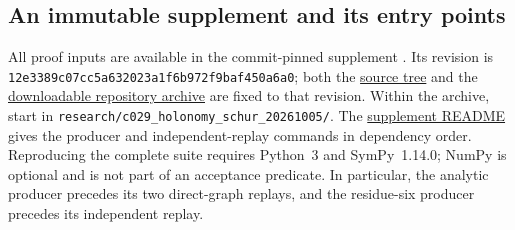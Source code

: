 \subsection{An immutable supplement and its entry points}

All proof inputs are available in the commit-pinned supplement
\cite{C029Supplement}. Its revision is
\nolinkurl{12e3389c07cc5a632023a1f6b972f9baf450a6a0}; both the
\href{https://github.com/whzy3185/math/tree/12e3389c07cc5a632023a1f6b972f9baf450a6a0/research/c029_holonomy_schur_20261005}{source tree}
and the \href{https://github.com/whzy3185/math/archive/12e3389c07cc5a632023a1f6b972f9baf450a6a0.zip}{downloadable repository archive}
are fixed to that revision. Within the archive, start in
\nolinkurl{research/c029_holonomy_schur_20261005/}.
The \href{https://github.com/whzy3185/math/blob/12e3389c07cc5a632023a1f6b972f9baf450a6a0/research/c029_holonomy_schur_20261005/README.md}{supplement README}
gives the producer and independent-replay commands in dependency order.
Reproducing the complete suite requires Python~3 and SymPy~1.14.0;
NumPy is optional and is not part of an acceptance predicate. In particular,
the analytic producer precedes its two direct-graph replays, and the
residue-six producer precedes its independent replay.

